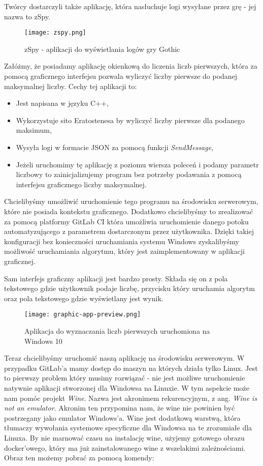Twórcy dostarczyli także aplikację, która nasłuchuje logi wysyłane przez grę - jej nazwa to zSpy.
\begin{figure}[htbp]
  \centering
  \texttt{[image: zspy.png]}
  \caption{zSpy - aplikacji do wyświetlania logów gry Gothic}
  \label{fig:gh_pages}
\end{figure}
\par
Załóżmy, że posiadamy aplikację okienkową do liczenia liczb pierwszych, która za pomocą graficznego interfejsu pozwala wyliczyć liczby pierwsze do podanej maksymalnej liczby. Cechy tej aplikacji to:
\begin{itemize}
  \item Jest napisana w języku C++,
  \item Wykorzystuje sito Eratostenesa by wyliczyć liczby pierwsze dla podanego maksimum,
  \item Wysyła logi w formacie JSON za pomocą funkcji \textit{SendMessage},
  \item Jeżeli uruchomimy tę aplikację z poziomu wiersza poleceń i podamy parametr liczbowy to zainicjalizujemy program bez potrzeby podawania z pomocą interfejsu graficznego liczby maksymalnej.
\end{itemize}
Chcielibyśmy umożliwić uruchomienie tego programu na środowisku serwerowym, które nie posiada kontekstu graficznego. Dodatkowo chcielibyśmy to zrealizować za pomocą platformy GitLab CI która umożliwia uruchomienie danego potoku automatyzującego z parametrem dostarczonym przez użytkownika. Dzięki takiej konfiguracji bez konieczności uruchamiania systemu Windows zyskalibyśmy możliwość uruchamiania algorytmu, który jest zaimplementowany w aplikacji graficznej.
\par
Sam interfejs graficzny aplikacji jest bardzo prosty. Składa się on z pola tekstowego gdzie użytkownik podaje liczbę, przycisku który uruchamia algorytm oraz pola tekstowego gdzie wyświetlany jest wynik.
\begin{figure}[htbp]
  \centering
  \texttt{[image: graphic-app-preview.png]}
  \caption{Aplikacja do wyznaczania liczb pierwszych uruchomiona na Windows 10}
  \label{fig:gh_pages}
\end{figure}
\par
Teraz chcielibyśmy uruchomić naszą aplikację na środowisku serwerowym. W przypadku GitLab'a mamy dostęp do maszyn na których działa tylko Linux. Jest to pierwszy problem który musimy rozwiązać - nie jest możliwe uruchomienie natywnie aplikacji stworzonej dla Windowsa na Linuxie. W tym aspekcie może nam pomóc projekt \textit{Wine}. Nazwa jest akronimem rekurencyjnym, z ang. \textit{Wine is not an emulator}. Akronim ten przypomina nam, że wine nie powinien być postrzegany jako emulator Windows'a. Wine jest dodatkową warstwą, która tłumaczy wywołania systemowe specyficzne dla Windowsa na te zrozumiałe dla Linuxa. By nie marnować czasu na instalację wine, użyjemy gotowego obrazu docker'owego, który ma już zainstalowanego wine z wszelakimi zależnościami. Obraz ten możemy pobrać za pomocą komendy:
